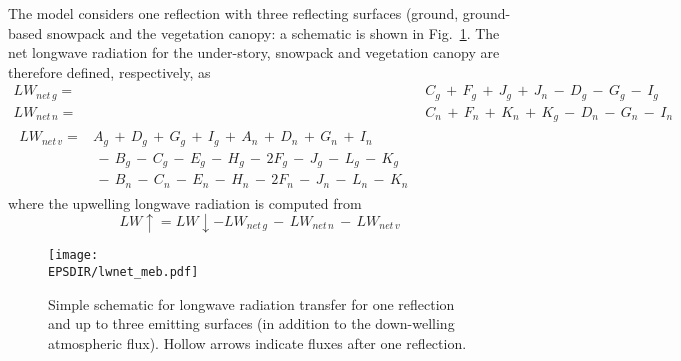 The model considers one reflection with three reflecting surfaces (ground, 
ground-based snowpack and the vegetation canopy: a schematic is shown
in Fig.~\ref{fig:meb_lwsnow_vg}. 
%
The net longwave radiation for the under-story, snowpack and vegetation canopy are therefore defined, 
respectively, as
%
\begin{subequations}\label{eq:meb_lw_gn_terms}
\begin{align}
 \label{eq:meb_lw_net_gn}
LW_{net\,g} =& C_{g} \,+\, F_{g} \,+\, J_{g}\,+\, J_{n}
\,-\,D_{g} \,-\, G_{g} \,-\, I_{g}
\\
 \label{eq:meb_lw_net_nn}
LW_{net\,n} =& C_{n} \,+\, F_{n} \,+\, K_{n}\,+\, K_{g}
\,-\,D_{n} \,-\, G_{n} \,-\, I_{n}
\\
 \label{eq:meb_lw_net_vn}
\begin{split}
LW_{net\,v} =& A_{g} \,+\, D_{g} \,+\, G_{g} \,+\, I_{g}
\,+\, A_{n} \,+\, D_{n} \,+\, G_{n} \,+\, I_{n}
\\
& \,-\, B_{g} \,-\, C_{g}\,-\, E_{g} \,-\, H_{g} \,-\, 2F_{g} \,-\, J_{g} \,-\, L_{g}\,-\, K_{g}
\\
&\,-\, B_{n} \,-\, C_{n}\,-\, E_{n} \,-\, H_{n} \,-\, 2F_{n} \,-\, J_{n} \,-\, L_{n}\,-\, K_{n}
%
\end{split}
\end{align}
\end{subequations}
%
where the upwelling longwave radiation is computed from
%
\begin{equation}
\label{eq:meb_lwup_gvn}
%
LW\uparrow = LW\downarrow - LW_{net\,g} \,-\, LW_{net\,n} \,-\, LW_{net\,v}
%
\end{equation}
%

\begin{figure}[!b]
\centerline{
\texttt{[image: \\EPSDIR/lwnet\_meb.pdf]}}
\caption{Simple schematic for longwave radiation transfer for one
reflection and up to three emitting surfaces (in addition to the
down-welling atmospheric flux). Hollow arrows indicate
fluxes after one reflection.}
\label{fig:meb_lwsnow_vg}
\end{figure}



